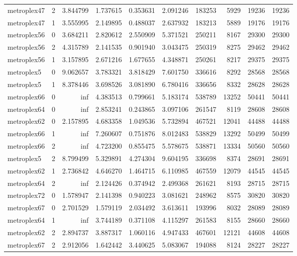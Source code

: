\begin{longtable}{|l|r|r|r|r|r|r|r|r|r|}
metroplex47 & 2 & 3.844799 & 1.737615 & 0.353631 & 2.091246 & 183253 & 5929 & 19236 & 19236 \\
metroplex47 & 1 & 3.555995 & 2.149895 & 0.488037 & 2.637932 & 183213 & 5889 & 19176 & 19176 \\
metroplex56 & 0 & 3.684211 & 2.820612 & 2.550909 & 5.371521 & 250211 & 8167 & 29300 & 29300 \\
metroplex56 & 2 & 4.315789 & 2.141535 & 0.901940 & 3.043475 & 250319 & 8275 & 29462 & 29462 \\
metroplex56 & 1 & 3.157895 & 2.671216 & 1.677655 & 4.348871 & 250261 & 8217 & 29375 & 29375 \\
metroplex5 & 0 & 9.062657 & 3.783321 & 3.818429 & 7.601750 & 336616 & 8292 & 28568 & 28568 \\
metroplex5 & 1 & 8.378446 & 3.698526 & 3.081890 & 6.780416 & 336656 & 8332 & 28628 & 28628 \\
metroplex66 & 0 & inf & 4.383513 & 0.799661 & 5.183174 & 538789 & 13252 & 50441 & 50441 \\
metroplex64 & 0 & inf & 2.853241 & 0.243865 & 3.097106 & 261547 & 8119 & 28608 & 28608 \\
metroplex62 & 0 & 2.157895 & 4.683358 & 1.049536 & 5.732894 & 467521 & 12041 & 44488 & 44488 \\
metroplex66 & 1 & inf & 7.260607 & 0.751876 & 8.012483 & 538829 & 13292 & 50499 & 50499 \\
metroplex66 & 2 & inf & 4.723200 & 0.855475 & 5.578675 & 538871 & 13334 & 50560 & 50560 \\
metroplex5 & 2 & 8.799499 & 5.329891 & 4.274304 & 9.604195 & 336698 & 8374 & 28691 & 28691 \\
metroplex62 & 1 & 2.736842 & 4.646270 & 1.464715 & 6.110985 & 467559 & 12079 & 44545 & 44545 \\
metroplex64 & 2 & inf & 2.124426 & 0.374942 & 2.499368 & 261621 & 8193 & 28715 & 28715 \\
metroplex72 & 0 & 1.578947 & 2.141398 & 0.940223 & 3.081621 & 248962 & 8575 & 30820 & 30820 \\
metroplex67 & 0 & 2.701529 & 1.579119 & 2.034492 & 3.613611 & 193996 & 8032 & 28089 & 28089 \\
metroplex64 & 1 & inf & 3.744189 & 0.371108 & 4.115297 & 261583 & 8155 & 28660 & 28660 \\
metroplex62 & 2 & 2.894737 & 3.887317 & 1.060116 & 4.947433 & 467601 & 12121 & 44608 & 44608 \\
metroplex67 & 2 & 2.912056 & 1.642442 & 3.440625 & 5.083067 & 194088 & 8124 & 28227 & 28227 \\

\end{longtable}
